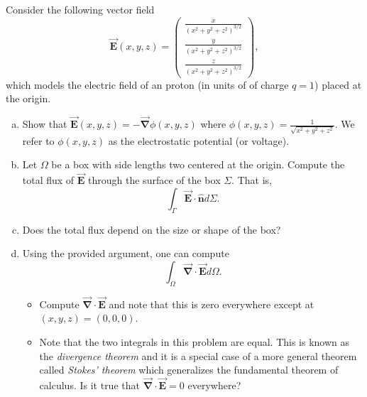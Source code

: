 \documentclass[12pt]{article} %
\newcommand{\grad}{\boldsymbol{\vec{\nabla}}}
\newcommand{\vecfieldE}{\boldsymbol{\vec{E}}}
\newcommand{\unitvec}{\boldsymbol{\hat{n}}}
\begin{document}
\begin{problem}
Consider the following vector field
\[
\vecfieldE(x,y,z) = \begin{pmatrix} \frac{x}{(x^2+y^2+z^2)^{3/2}} \\ \frac{y}{(x^2+y^2+z^2)^{3/2}} \\ \frac{z}{(x^2+y^2+z^2)^{3/2}} \end{pmatrix},
\]
which models the electric field of an proton (in units of of charge $q=1$) placed at the origin.
\begin{enumerate}[(a)]
	\item Show that $\vecfieldE(x,y,z) = - \grad \phi(x,y,z)$ where $\phi(x,y,z) = \frac{1}{\sqrt{x^2+y^2+z^2}}$.  We refer to $\phi(x,y,z)$ as the electrostatic potential (or voltage).
	\item Let $\Omega$ be a box with side lengths two centered at the origin.  Compute the total flux of $\vecfieldE$ through the surface of the box $\Sigma$. That is,
	\[
	\int_\Gamma \vecfieldE \cdot \unitvec d\Sigma.
	\]
	\item Does the total flux depend on the size or shape of the box?
	\item Using the provided argument, one can compute
	\[
	\int_\Omega \grad \cdot \vecfieldE d\Omega.
	\]
	\begin{itemize}
		\item Compute $\grad \cdot \vecfieldE$ and note that this is zero everywhere except at $(x,y,z)=(0,0,0)$.
		\item Note that the two integrals in this problem are equal. This is known as the \emph{divergence theorem} and it is a special case of a more general theorem called \emph{Stokes' theorem} which generalizes the fundamental theorem of calculus. Is it true that $\grad \cdot \vecfieldE = 0$ everywhere?
	\end{itemize}
\end{enumerate}
\end{problem}
\end{document}
